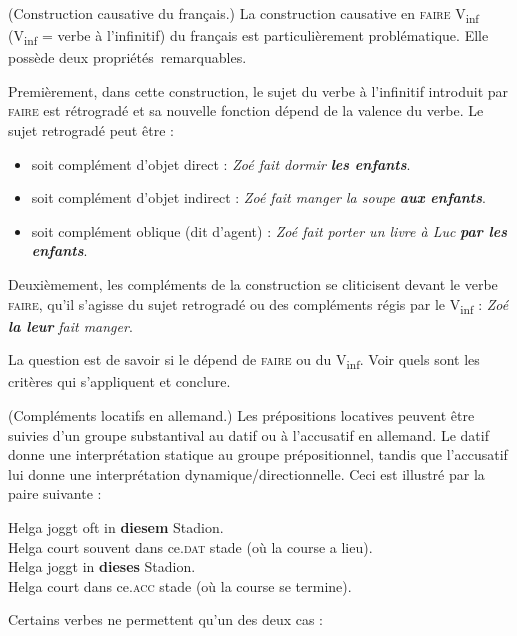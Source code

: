 {     (Construction causative du français.) La construction causative en \textsc{faire} V\textsubscript{inf}
     (V\textsubscript{inf} = verbe à l’infinitif) du français est particulièrement problématique. Elle possède deux propriétés~remarquables.

    Premièrement, dans cette construction, le sujet du verbe à l’infinitif introduit par \textsc{faire} est rétrogradé et sa nouvelle fonction dépend de la valence du verbe. Le sujet retrogradé peut être :
    \begin{itemize}
    \item  soit complément d’objet direct : \textit{Zoé fait dormir} \textbf{\textit{les enfants}}.
    \item  soit complément d’objet indirect : \textit{Zoé fait manger la soupe} \textbf{\textit{aux enfants}}.
    \item  soit complément oblique (dit d’agent) : \textit{Zoé fait porter un livre à Luc} \textbf{\textit{par les enfants}}.
    \end{itemize}
    Deuxièmement, les compléments de la construction se cliticisent devant le verbe \textsc{faire}, qu’il s’agisse du sujet retrogradé ou des compléments régis par le V\textsubscript{inf} : \textit{Zoé} \textbf{\textit{la leur}} \textit{fait manger}.

    La question est de savoir si le  dépend de \textsc{faire} ou du V\textsubscript{inf}. Voir quels sont les critères qui s’appliquent et conclure.

     (Compléments locatifs en allemand.) Les prépositions locatives peuvent être suivies d’un groupe substantival au datif ou à l’accusatif en allemand. Le datif donne une interprétation statique au groupe prépositionnel, tandis que l’accusatif lui donne une interprétation dynamique/directionnelle. Ceci est illustré par la paire suivante :

    \begin{exe}
    \gll   Helga joggt oft in \textbf{diesem} Stadion.\\
    Helga court souvent dans ce.\textsc{dat} stade (où la course a lieu).\\
    \gll   Helga joggt in \textbf{dieses} Stadion.\\
    Helga court dans ce.\textsc{acc} stade (où la course se termine).\\
    \end{exe}
    
   \noindent Certains verbes ne permettent qu’un des deux cas :

}
